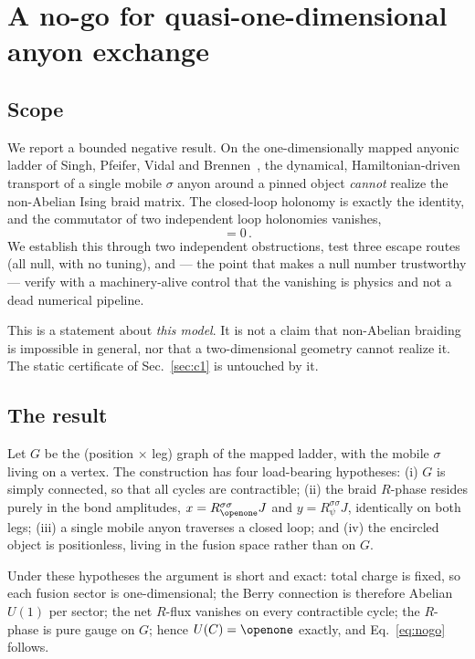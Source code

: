 \documentclass[aps,pra,twocolumn,superscriptaddress,longbibliography,floatfix,nofootinbib]{revtex4-2}
\newcommand{\Id}{\openone}
\begin{document}
\section{A no-go for quasi-one-dimensional anyon exchange}
\label{sec:nogo}

\subsection{Scope}
\label{sec:nogoscope}

We report a bounded negative result. On the one-dimensionally mapped anyonic
ladder of Singh, Pfeifer, Vidal and Brennen~\cite{Singh2014,Ayeni2016}, the
dynamical, Hamiltonian-driven transport of a single mobile $\sigma$ anyon
around a pinned object \emph{cannot} realize the non-Abelian Ising braid
matrix. The closed-loop holonomy is exactly the identity, and the commutator of
two independent loop holonomies vanishes,
\begin{equation}
  [U(C_1),\,U(C_2)] = 0\,.
  \label{eq:nogo}
\end{equation}
We establish this through two independent obstructions, test three escape
routes (all null, with no tuning), and --- the point that makes a null number
trustworthy --- verify with a machinery-alive control that the vanishing is
physics and not a dead numerical pipeline.

This is a statement about \emph{this model}. It is not a claim that non-Abelian
braiding is impossible in general, nor that a two-dimensional geometry cannot
realize it. The static certificate of Sec.~\ref{sec:c1} is untouched by it.

\subsection{The result}
\label{sec:nogoresult}

Let $G$ be the (position $\times$ leg) graph of the mapped ladder, with the
mobile $\sigma$ living on a vertex. The construction has four load-bearing
hypotheses: (i) $G$ is simply connected, so that all cycles are contractible;
(ii) the braid $R$-phase resides purely in the bond amplitudes,
$x=R^{\sigma\sigma}_{\Id}J$ and $y=R^{\sigma\sigma}_{\psi}J$, identically on
both legs; (iii) a single mobile anyon traverses a closed loop; and (iv) the
encircled object is positionless, living in the fusion space rather than on
$G$.

Under these hypotheses the argument is short and exact: total charge is fixed,
so each fusion sector is one-dimensional; the Berry connection is therefore
Abelian $U(1)$ per sector; the net $R$-flux vanishes on every contractible
cycle; the $R$-phase is pure gauge on $G$; hence $U(C)=\Id$ exactly, and
Eq.~\eqref{eq:nogo} follows.
\end{document}
